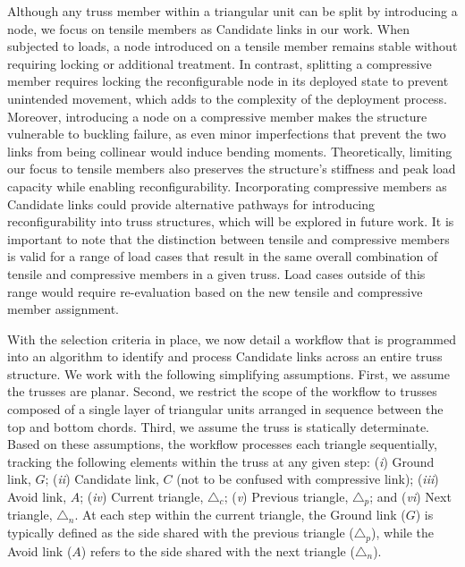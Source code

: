 Although any truss member within a triangular unit can be split by introducing a node, we focus on tensile members as Candidate links in our work. When subjected to loads, a node introduced on a tensile member remains stable without requiring locking or additional treatment. In contrast, splitting a compressive member requires locking the reconfigurable node in its deployed state to prevent unintended movement, which adds to the complexity of the deployment process. Moreover, introducing a node on a compressive member makes the structure vulnerable to buckling failure, as even minor imperfections that prevent the two links from being collinear would induce bending moments. Theoretically, limiting our focus to tensile members also preserves the structure's stiffness and peak load capacity while enabling reconfigurability. Incorporating compressive members as Candidate links could provide alternative pathways for introducing reconfigurability into truss structures, which will be explored in future work. It is important to note that the distinction between tensile and compressive members is valid for a range of load cases that result in the same overall combination of tensile and compressive members in a given truss. Load cases outside of this range would require re-evaluation based on the new tensile and compressive member assignment.

With the selection criteria in place, we now detail a workflow that is programmed into an algorithm to identify and process Candidate links across an entire truss structure. We work with the following simplifying assumptions. First, we assume the trusses are planar. Second, we restrict the scope of the workflow to trusses composed of a single layer of triangular units arranged in sequence between the top and bottom chords. Third, we assume the truss is statically determinate. Based on these assumptions, the workflow processes each triangle sequentially, tracking the following elements within the truss at any given step:
(\textit{i}) Ground link, \(G\);
(\textit{ii}) Candidate link, \(C\) (not to be confused with compressive link);
(\textit{iii}) Avoid link, \(A\);
(\textit{iv}) Current triangle, \(\triangle_{c}\);
(\textit{v}) Previous triangle, \(\triangle_{p}\); and
(\textit{vi}) Next triangle, \(\triangle_{n}\).
At each step within the current triangle, the Ground link (\(G\)) is typically defined as the side shared with the previous triangle (\(\triangle_p\)), while the Avoid link (\(A\)) refers to the side shared with the next triangle (\(\triangle_n\)).

